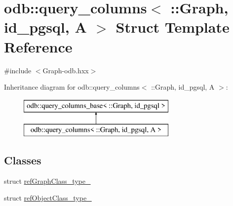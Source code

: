 \hypertarget{structodb_1_1query__columns_3_01_1_1_graph_00_01id__pgsql_00_01_a_01_4}{}\section{odb\+:\+:query\+\_\+columns$<$ \+:\+:Graph, id\+\_\+pgsql, A $>$ Struct Template Reference}
\label{structodb_1_1query__columns_3_01_1_1_graph_00_01id__pgsql_00_01_a_01_4}


{\ttfamily \#include $<$Graph-\/odb.\+hxx$>$}

Inheritance diagram for odb\+:\+:query\+\_\+columns$<$ \+:\+:Graph, id\+\_\+pgsql, A $>$\+:\begin{figure}[H]
\begin{center}
\leavevmode
\includegraphics[height=2.000000cm]{d2/d71/structodb_1_1query__columns_3_01_1_1_graph_00_01id__pgsql_00_01_a_01_4}
\end{center}
\end{figure}
\subsection*{Classes}
\begin{DoxyCompactItemize}
\item 
struct \hyperlink{structodb_1_1query__columns_3_01_1_1_graph_00_01id__pgsql_00_01_a_01_4_1_1ref_graph_class__type__}{ref\+Graph\+Class\+\_\+type\+\_\+}
\item 
struct \hyperlink{structodb_1_1query__columns_3_01_1_1_graph_00_01id__pgsql_00_01_a_01_4_1_1ref_object_class__type__}{ref\+Object\+Class\+\_\+type\+\_\+}
\end{DoxyCompactItemize}
